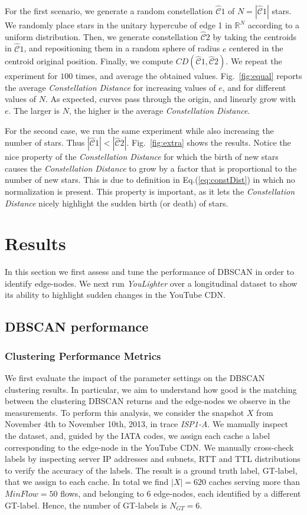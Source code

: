 \documentclass{acm_proc_article-sp}
\newcommand{\tool}{\textit{YouLighter}\xspace}
\newcommand{\distance}{\textit{Constellation Distance}\xspace}
\newcommand{\node}{{edge-node}\xspace}
\newcommand{\nodes}{{edge-nodes}\xspace}
\newcommand{\TApub}{\textit{ISP1-A}\xspace}
\begin{document}
For the first scenario, we generate a random constellation $\hat{\mathcal{C}}1$ of $N=|\hat{\mathcal{C}}1|$ stars. We randomly place stars in the unitary hypercube of edge 1 in $\mathbb{R}^{N}$ according to a uniform distribution. Then, we generate constellation $\hat{\mathcal{C}}2$ by taking the centroids in $\hat{\mathcal{C}}1$, and repositioning them in a random sphere of radius $e$ centered in the centroid original position. Finally, we compute $CD(\hat{\mathcal{C}}1,\hat{\mathcal{C}}2)$.
We repeat the experiment for $100$ times, and average the obtained values.
Fig.~\ref{fig:equal} reports the average \distance for increasing values of $e$, and for different values of $N$. As expected, curves pass through the origin, and linearly grow with $e$. The larger is $N$, the higher is the average \distance.

For the second case, we run the same experiment while also increasing the number of stars. Thus
$|\hat{\mathcal{C}}1| < |\hat{\mathcal{C}}2|$.
Fig.~\ref{fig:extra} shows the results. Notice the nice property of the \distance for which the birth of new stars causes the \distance to grow by a factor that is proportional to the number of new stars. This is due to definition in Eq.(\ref{eq:constDist}) in which no normalization is present.
This property is important, as it lets the \distance nicely highlight the sudden birth (or death) of stars.





\section{Results}
\label{sec:results}

In this section we first assess and tune the performance of DBSCAN in order to identify \nodes.
We next run \tool over a longitudinal dataset to show its ability to highlight sudden changes in the YouTube CDN.

\subsection{DBSCAN performance}
\subsubsection{Clustering Performance Metrics}
We first evaluate the impact of the parameter settings on the DBSCAN clustering results. In particular, we aim to understand how good is the matching between the clustering DBSCAN returns and the \nodes we observe in the measurements. To perform this analysis, we consider the snapshot $X$ from November 4th to November 10th, 2013, in trace \TApub. We manually inspect the dataset, and, guided by the IATA codes, we assign each cache a label corresponding to the \node in the YouTube CDN. We manually cross-check labels by inspecting server IP addresses and subnets, RTT and TTL distributions to verify the accuracy of the labels. The result is a ground truth label, GT-label, that we assign to each cache.
In total we find $|X|=620$ caches serving more than $MinFlow=50$ flows, and belonging to 6 \nodes, each identified by a different GT-label. Hence, the number of GT-labels is $N_{GT}=6$.
\end{document}
